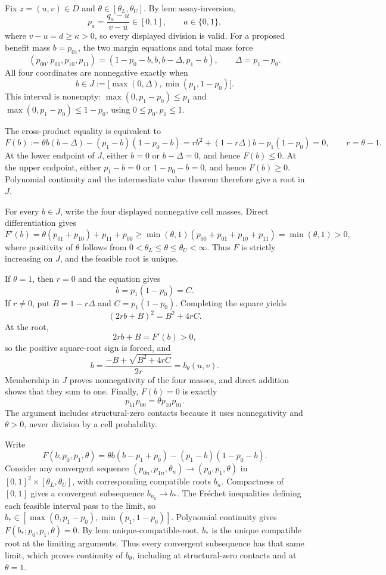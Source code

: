 Fix \(z=(u,v)\in D\) and \(\theta\in[\theta_L,\theta_U]\). By \(\mathrm{lem:assay\text{-}inversion}\),
\[
p_a=\frac{q_a-u}{v-u}\in[0,1],\qquad a\in\{0,1\},
\]
where \(v-u=d\geq\kappa>0\), so every displayed division is valid. For a proposed benefit mass \(b=p_{01}\), the two margin equations and total mass force
\[
(p_{00},p_{01},p_{10},p_{11})
=(1-p_0-b,b,b-\Delta,p_1-b),
\qquad \Delta=p_1-p_0.
\]
All four coordinates are nonnegative exactly when
\[
b\in J:=\bigl[\max(0,\Delta),\min(p_1,1-p_0)\bigr].
\]
This interval is nonempty: \(\max(0,p_1-p_0)\leq p_1\) and \(\max(0,p_1-p_0)\leq1-p_0\), using \(0\leq p_0,p_1\leq1\).

The cross-product equality is equivalent to
\[
F(b):=\theta b(b-\Delta)-(p_1-b)(1-p_0-b)
=r b^2+(1-r\Delta)b-p_1(1-p_0)=0,
\qquad r=\theta-1.
\]
At the lower endpoint of \(J\), either \(b=0\) or \(b-\Delta=0\), and hence \(F(b)\leq0\). At the upper endpoint, either \(p_1-b=0\) or \(1-p_0-b=0\), and hence \(F(b)\geq0\). Polynomial continuity and the intermediate value theorem therefore give a root in \(J\).

For every \(b\in J\), write the four displayed nonnegative cell masses. Direct differentiation gives
\[
F'(b)=\theta(p_{01}+p_{10})+p_{11}+p_{00}
\geq \min(\theta,1)
(p_{00}+p_{01}+p_{10}+p_{11})
=\min(\theta,1)>0,
\]
where positivity of \(\theta\) follows from \(0<\theta_L\leq\theta\leq\theta_U<\infty\). Thus \(F\) is strictly increasing on \(J\), and the feasible root is unique.

If \(\theta=1\), then \(r=0\) and the equation gives
\[
b=p_1(1-p_0)=C.
\]
If \(r\neq0\), put \(B=1-r\Delta\) and \(C=p_1(1-p_0)\). Completing the square yields
\[
(2rb+B)^2=B^2+4rC.
\]
At the root,
\[
2rb+B=F'(b)>0,
\]
so the positive square-root sign is forced, and
\[
b=\frac{-B+\sqrt{B^2+4rC}}{2r}=b_\theta(u,v).
\]
Membership in \(J\) proves nonnegativity of the four masses, and direct addition shows that they sum to one. Finally, \(F(b)=0\) is exactly
\[
p_{11}p_{00}=\theta p_{10}p_{01}.
\]
The argument includes structural-zero contacts because it uses nonnegativity and \(\theta>0\), never division by a cell probability.

Write
\[
F(b;p_0,p_1,\theta)
=\theta b(b-p_1+p_0)-(p_1-b)(1-p_0-b).
\]
Consider any convergent sequence \((p_{0n},p_{1n},\theta_n)\to(p_0,p_1,\theta)\) in \([0,1]^2\times[\theta_L,\theta_U]\), with corresponding compatible roots \(b_n\). Compactness of \([0,1]\) gives a convergent subsequence \(b_{n_k}\to b_*\). The Fr\'echet inequalities defining each feasible interval pass to the limit, so \(b_*\in[\max(0,p_1-p_0),\min(p_1,1-p_0)]\). Polynomial continuity gives \(F(b_*;p_0,p_1,\theta)=0\). By \(\mathrm{lem:unique\text{-}compatible\text{-}root}\), \(b_*\) is the unique compatible root at the limiting arguments. Thus every convergent subsequence has that same limit, which proves continuity of \(b_\theta\), including at structural-zero contacts and at \(\theta=1\).

